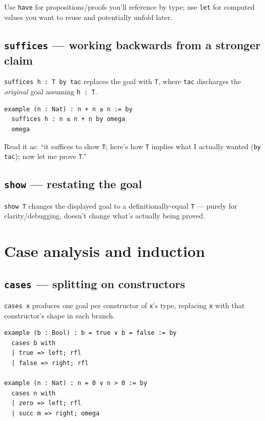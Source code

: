 Use \texttt{have} for propositions/proofs you'll reference by type; use \texttt{let} for computed values you want to reuse and potentially unfold later.

\subsection{\texttt{suffices} --- working backwards from a stronger claim}

\texttt{suffices h : T by tac} replaces the goal with \texttt{T}, where \texttt{tac} discharges the \emph{original} goal assuming \texttt{h : T}.

\begin{verbatim}
example (n : Nat) : n + n ≥ n := by
  suffices h : n ≤ n + n by omega
  omega
\end{verbatim}

Read it as: ``it suffices to show \texttt{T}; here's how \texttt{T} implies what I actually wanted (\texttt{by tac}); now let me prove \texttt{T}.''

\subsection{\texttt{show} --- restating the goal}

\texttt{show T} changes the displayed goal to a definitionally-equal \texttt{T} --- purely for clarity/debugging, doesn't change what's actually being proved.

\section{Case analysis and induction}

\subsection{\texttt{cases} --- splitting on constructors}

\texttt{cases x} produces one goal per constructor of \texttt{x}'s type, replacing \texttt{x} with that constructor's shape in each branch.

\begin{verbatim}
example (b : Bool) : b = true ∨ b = false := by
  cases b with
  | true => left; rfl
  | false => right; rfl

example (n : Nat) : n = 0 ∨ n > 0 := by
  cases n with
  | zero => left; rfl
  | succ m => right; omega
\end{verbatim}

